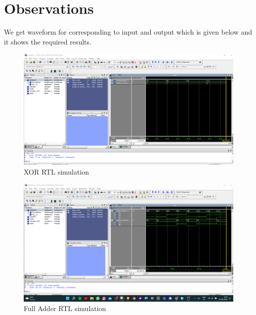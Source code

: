 \documentclass[12pt]{article}
\begin{document}
\section{Observations}
 
We get waveform for corresponding to input and output which is given below and it shows the required results.

\begin{figure}[h]

  \includegraphics[scale=0.4]{images/XOR_RTL_WAVEFORM.png}  %
  \caption{XOR RTL simulation}
  \label{XOR_RTL}
\end{figure}

\begin{figure}[h]
\centering
  \includegraphics[scale=0.4]{images/FULLADDER_RTL_WAVEFORM.png}  %
  \caption{Full Adder RTL simulation}
  \label{Full_adder_RTL}
\end{figure}
\end{document}
